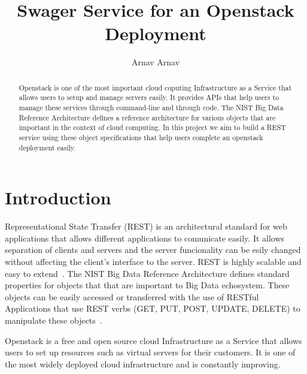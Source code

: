 
\title{Swager Service for an Openstack Deployment}


\author{Arnav Arnav}


\renewcommand{\shortauthors}{Arnav}


\begin{abstract}
Openstack is one of the most important cloud coputing Infrastructure
as a Service that allows users to setup and manage servers easily. It
provides APIs that help users to manage these services through
command-line and through code. The NIST Big Data Reference
Architecture defines a reference architecture for various objects that
are important in the context of cloud computing. In this project we
aim to build a REST service using these object specifications that
help users complete an openstack deployment easily.
\end{abstract}



\maketitle

\section{Introduction}
Representational State Transfer (REST) is an architectural standard
for web applications that allows different applications to comunicate
easily. It allows separation of clients and servers and the server
funcionality can be esily changed without affecting the client's
interface to the server. REST is highly scalable and easy to
extend~\cite{hid-sp18-503-REST}. The NIST Big Data Reference
Architecture defines standard properties for objects that that are
important to Big Data echosystem.%
These objects can be easily accessed or transferred with the use of
RESTful Applications
that use REST verbs (GET, PUT, POST, UPDATE, DELETE) to manipulate
these objects~\cite{hid-sp18-503-REST}.

Openstack is a free and open source cloud Infrastructure as a Service
that allows users to set up resources such as virtual servers for
their customers. It is one of the most widely deployed cloud
infrastructure and is constantly improving.

